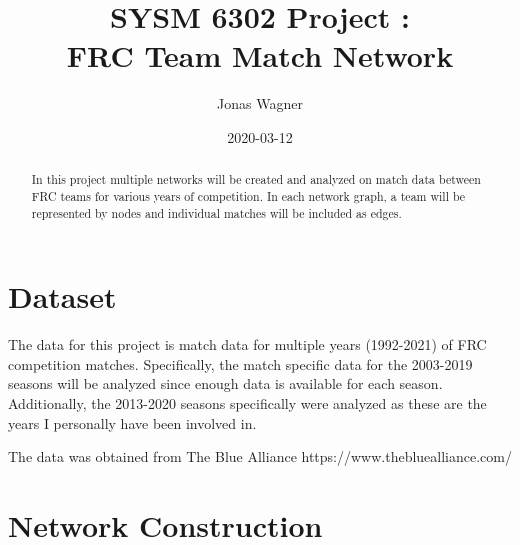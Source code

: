 \documentclass[]{article}
\title{SYSM 6302 Project :\\
FRC Team Match Network}
\author{Jonas Wagner}
\date{2020-03-12}
\begin{document}
\maketitle

\begin{abstract}
	In this project multiple networks will be created and analyzed on match data between FRC teams for various years of competition. In each network graph, a team will be represented by nodes and individual matches will be included as edges. 
\end{abstract}

\section{Dataset}
The data for this project is match data for multiple years (1992-2021)  of FRC competition matches. Specifically, the match specific data for the 2003-2019 seasons 
will be analyzed since enough data is available for each season. Additionally, the 2013-2020 seasons specifically were analyzed as these are the years I personally have been involved in.

The data was obtained from The Blue Alliance https://www.thebluealliance.com/

\section{Network Construction}

%
%
%
\end{document}
